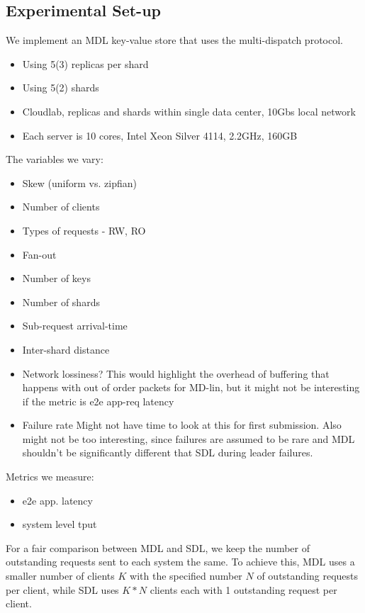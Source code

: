 \subsection{Experimental Set-up}
We implement an MDL key-value store that uses the multi-dispatch protocol.
\begin{itemize}
    \item Using 5(3) replicas per shard
    \item Using 5(2) shards
    \item Cloudlab, replicas and shards within single data center, 10Gbs local network
    \item Each server is 10 cores, Intel Xeon Silver 4114, 2.2GHz, 160GB
\end{itemize}
The variables we vary:
\begin{itemize}
    \item Skew (uniform vs. zipfian)
    \item Number of clients
    \item Types of requests - RW, RO
    \item Fan-out
    \item Number of keys
    \item Number of shards
    \item Sub-request arrival-time
    \item Inter-shard distance
    \item Network lossiness?
        \subitem This would highlight the overhead of buffering that happens with out of order packets for MD-lin, but it might not be interesting if the metric is e2e app-req latency
    \item Failure rate
        \subitem Might not have time to look at this for first submission. Also might not be too interesting, since failures are assumed to be rare and MDL shouldn't be significantly different that SDL during leader failures.
\end{itemize}

Metrics we measure:
\begin{itemize}
    \item e2e app. latency
    \item system level tput
\end{itemize}

For a fair comparison between MDL and SDL, we keep the number of outstanding requests sent to each system the same. To achieve this, MDL uses a smaller number of clients $K$ with the specified number $N$ of outstanding requests per client, while SDL uses $K*N$ clients each with 1 outstanding request per client.

